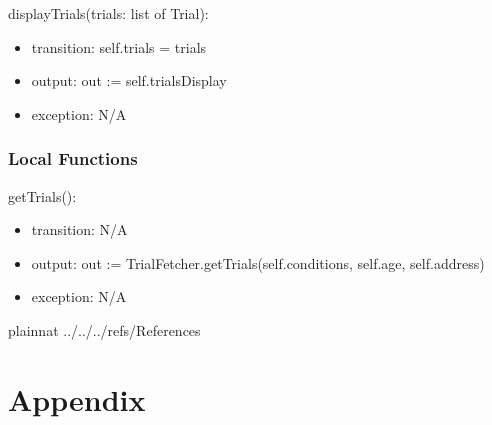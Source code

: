 \documentclass[12pt, titlepage]{article}
\begin{document}
\noindent displayTrials(trials: list of Trial):
\begin{itemize}
\item transition: self.trials = trials
\item output: out := self.trialsDisplay 
\item exception: N/A
\end{itemize}

\subsubsection{Local Functions}

\noindent getTrials():
\begin{itemize}
\item transition: N/A
\item output: out := TrialFetcher.getTrials(self.conditions, self.age, self.address)
\item exception: N/A
\end{itemize}



\newpage

 {plainnat}
 {../../../refs/References}

\newpage

\section{Appendix} \label{Appendix}

\end{document}
